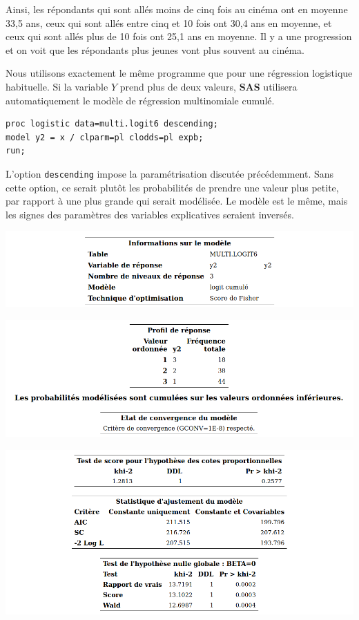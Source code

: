 \documentclass[
  11pt,
  letterpaper,
]{book}
\theoremstyle{definition}
\theoremstyle{definition}
\theoremstyle{definition}
\theoremstyle{remark}
\begin{document}
Ainsi, les répondants qui sont allés moins de cinq fois au cinéma ont en moyenne 33,5 ans, ceux qui sont allés entre cinq et 10 fois ont 30,4 ans en moyenne, et ceux qui sont allés plus de 10 fois ont 25,1 ans en moyenne. Il y a une progression et on voit que les répondants plus jeunes vont plus souvent au cinéma.

Nous utilisons exactement le même programme que pour une régression logistique habituelle. Si la variable \(Y\) prend plus de deux valeurs, \textbf{SAS} utilisera automatiquement le modèle de régression multinomiale cumulé.

\begin{verbatim}
proc logistic data=multi.logit6 descending;
model y2 = x / clparm=pl clodds=pl expb;
run;
\end{verbatim}

L'option \texttt{descending} impose la paramétrisation discutée précédemment. Sans cette option, ce serait plutôt les probabilités de prendre une valeur plus petite, par rapport à une plus grande qui serait modélisée. Le modèle est le même, mais les signes des paramètres des variables explicatives seraient inversés.

\begin{center}\includegraphics[width=0.8\linewidth]{figures/03-logistic-e26} \end{center}

\begin{center}\includegraphics[width=0.8\linewidth]{figures/03-logistic-e27} \end{center}

\begin{center}\includegraphics[width=0.8\linewidth]{figures/03-logistic-e28} \end{center}
\end{document}
